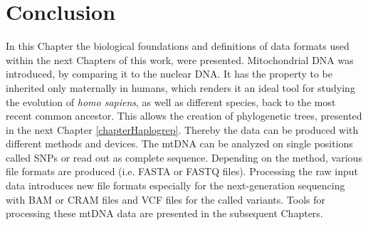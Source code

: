 \section{Conclusion}
In this Chapter the biological foundations and definitions of data formats used within the next Chapters of this work, were presented. Mitochondrial DNA was introduced, by comparing it to the nuclear DNA. It has the property to be inherited only maternally in humans, which renders it an ideal tool for studying the evolution of \textit{homo sapiens}, as well as different species, back to the most recent common ancestor. This allows the creation of phylogenetic trees, presented in the next Chapter \ref{chapterHaplogrep}. Thereby the data can be produced with different methods and devices. The mtDNA can be analyzed on single positions called SNPs or read out as complete sequence. Depending on the method, various file formats are produced (i.e. FASTA or FASTQ files). Processing the raw input data introduces new file formats especially for the next-generation sequencing with BAM or CRAM files and VCF files for the called variants. Tools for processing these mtDNA data are presented in the subsequent Chapters.